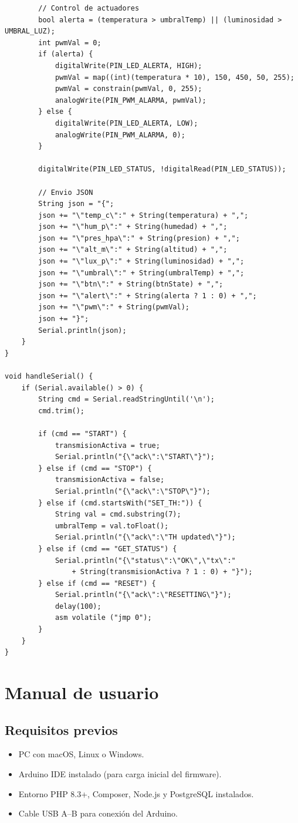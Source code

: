 \begin{verbatim}
        // Control de actuadores
        bool alerta = (temperatura > umbralTemp) || (luminosidad > UMBRAL_LUZ);
        int pwmVal = 0;
        if (alerta) {
            digitalWrite(PIN_LED_ALERTA, HIGH);
            pwmVal = map((int)(temperatura * 10), 150, 450, 50, 255);
            pwmVal = constrain(pwmVal, 0, 255);
            analogWrite(PIN_PWM_ALARMA, pwmVal);
        } else {
            digitalWrite(PIN_LED_ALERTA, LOW);
            analogWrite(PIN_PWM_ALARMA, 0);
        }

        digitalWrite(PIN_LED_STATUS, !digitalRead(PIN_LED_STATUS));

        // Envio JSON
        String json = "{";
        json += "\"temp_c\":" + String(temperatura) + ",";
        json += "\"hum_p\":" + String(humedad) + ",";
        json += "\"pres_hpa\":" + String(presion) + ",";
        json += "\"alt_m\":" + String(altitud) + ",";
        json += "\"lux_p\":" + String(luminosidad) + ",";
        json += "\"umbral\":" + String(umbralTemp) + ",";
        json += "\"btn\":" + String(btnState) + ",";
        json += "\"alert\":" + String(alerta ? 1 : 0) + ",";
        json += "\"pwm\":" + String(pwmVal);
        json += "}";
        Serial.println(json);
    }
}

void handleSerial() {
    if (Serial.available() > 0) {
        String cmd = Serial.readStringUntil('\n');
        cmd.trim();

        if (cmd == "START") {
            transmisionActiva = true;
            Serial.println("{\"ack\":\"START\"}");
        } else if (cmd == "STOP") {
            transmisionActiva = false;
            Serial.println("{\"ack\":\"STOP\"}");
        } else if (cmd.startsWith("SET_TH:")) {
            String val = cmd.substring(7);
            umbralTemp = val.toFloat();
            Serial.println("{\"ack\":\"TH updated\"}");
        } else if (cmd == "GET_STATUS") {
            Serial.println("{\"status\":\"OK\",\"tx\":" 
                + String(transmisionActiva ? 1 : 0) + "}");
        } else if (cmd == "RESET") {
            Serial.println("{\"ack\":\"RESETTING\"}");
            delay(100);
            asm volatile ("jmp 0");
        }
    }
}
\end{verbatim}

\section{Manual de usuario}

\subsection{Requisitos previos}
\begin{itemize}[leftmargin=*]
    \item PC con macOS, Linux o Windows.
    \item Arduino IDE instalado (para carga inicial del firmware).
    \item Entorno PHP 8.3+, Composer, Node.js y PostgreSQL instalados.
    \item Cable USB A--B para conexión del Arduino.
\end{itemize}

